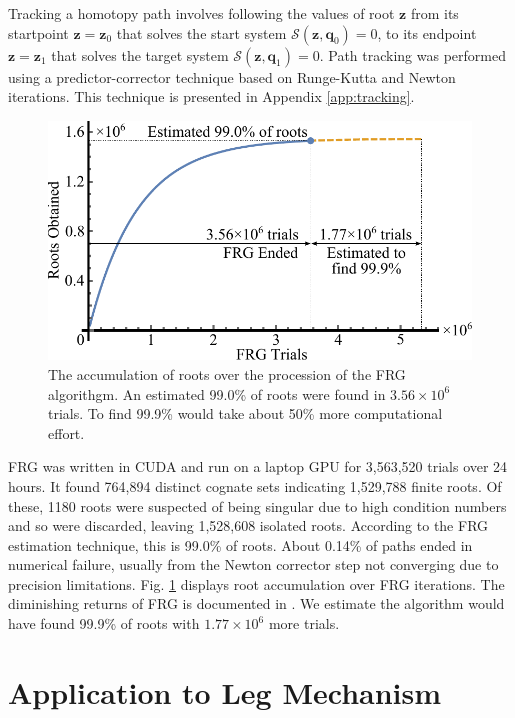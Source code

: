 \documentclass[journal]{IEEEtran}
\begin{document}
Tracking a homotopy path involves following the values of root $\mathbf{z}$ from its startpoint $\mathbf{z} = \mathbf{z}_0$ that solves the start system $\mathcal{S}(\mathbf{z},\mathbf{q}_0)=0$, to its endpoint $\mathbf{z} = \mathbf{z}_1$ that solves the target system $\mathcal{S}(\mathbf{z},\mathbf{q}_1)=0$.
Path tracking was performed using a predictor-corrector technique based on Runge-Kutta and Newton iterations.  
This technique is presented in Appendix \ref{app:tracking}.


\begin{figure}[t]
\centering
\includegraphics[scale=0.6]{frg_results}
\caption{The accumulation of roots over the procession of the FRG algorithgm.  An estimated 99.0\% of roots were found in $3.56 \times 10^6$ trials.  To find 99.9\% would take about 50\% more computational effort.}
\label{frg_results}
\end{figure}


FRG was written in CUDA and run on a laptop GPU for 3,563,520 trials over 24 hours.
It found 764,894 distinct cognate sets indicating 1,529,788 finite roots.
Of these, 1180 roots were suspected of being singular due to high condition numbers and so were discarded, leaving 1,528,608 isolated roots.
According to the FRG estimation technique, this is 99.0\% of roots.  About 0.14\% of paths ended in numerical failure, usually from the Newton corrector step not converging due to precision limitations.  Fig. \ref{frg_results} displays root accumulation over FRG iterations.  The diminishing returns of FRG is documented in \cite{plecnikStudyFindingFinite2017}.  We estimate the algorithm would have found 99.9\% of roots with $1.77\times 10^6$ more trials.



\section{Application to Leg Mechanism}
\label{sec:leg_app}
\end{document}
